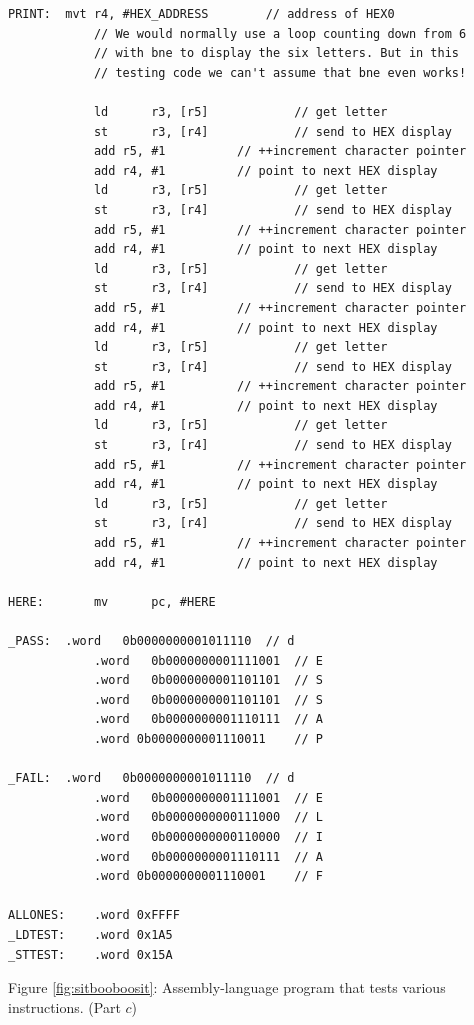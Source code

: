 \documentclass[epsfig,10pt,fullpage]{article}
\begin{document}
\begin{center}
\begin{minipage}[t]{12.5 cm}
\begin{lstlisting}[name=proc]
PRINT:	mvt	r4, #HEX_ADDRESS		// address of HEX0 
			// We would normally use a loop counting down from 6
			// with bne to display the six letters. But in this
			// testing code we can't assume that bne even works!

			ld		r3, [r5]			// get letter 
 			st		r3, [r4]			// send to HEX display
 			add	r5, #1			// ++increment character pointer 
 			add	r4, #1			// point to next HEX display
			ld		r3, [r5]			// get letter 
 			st		r3, [r4]			// send to HEX display
 			add	r5, #1			// ++increment character pointer 
 			add	r4, #1			// point to next HEX display
			ld		r3, [r5]			// get letter 
 			st		r3, [r4]			// send to HEX display
 			add	r5, #1			// ++increment character pointer 
 			add	r4, #1			// point to next HEX display
			ld		r3, [r5]			// get letter 
 			st		r3, [r4]			// send to HEX display
 			add	r5, #1			// ++increment character pointer 
 			add	r4, #1			// point to next HEX display
			ld		r3, [r5]			// get letter 
 			st		r3, [r4]			// send to HEX display
 			add	r5, #1			// ++increment character pointer 
 			add	r4, #1			// point to next HEX display
			ld		r3, [r5]			// get letter 
 			st		r3, [r4]			// send to HEX display
 			add	r5, #1			// ++increment character pointer 
 			add	r4, #1			// point to next HEX display
			
HERE:		mv		pc, #HERE

_PASS:	.word	0b0000000001011110	// d
			.word	0b0000000001111001	// E
			.word	0b0000000001101101	// S
			.word	0b0000000001101101	// S
			.word	0b0000000001110111	// A
			.word 0b0000000001110011	// P

_FAIL:	.word	0b0000000001011110	// d
			.word	0b0000000001111001	// E
			.word	0b0000000000111000	// L
			.word	0b0000000000110000	// I
			.word	0b0000000001110111	// A
			.word 0b0000000001110001	// F

ALLONES:	.word 0xFFFF
_LDTEST:	.word 0x1A5
_STTEST:	.word 0x15A
\end{lstlisting}
\end{minipage}
\end{center}

\begin{center}
Figure \ref{fig:sitbooboosit}: Assembly-language program that tests various instructions. (Part $c$)
\end{center}
\end{document}
